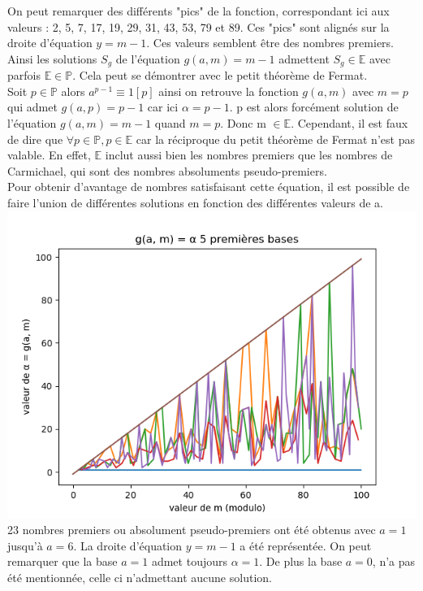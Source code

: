\documentclass{article}
\begin{document}
On peut remarquer des différents "pics" de la fonction, correspondant ici aux valeurs : 2, 5, 7, 17, 19, 29, 31, 43, 53, 79 et 89. Ces "pics" sont alignés sur la droite d'équation $y=m-1$. Ces valeurs semblent être des nombres premiers.\\
Ainsi les solutions $S_g$ de l'équation $g(a, m) = m - 1$ admettent $S_g\in\mathbb{E}$ avec parfois $\mathbb{E}\in\mathbb{P}$.
Cela peut se démontrer avec le petit théorème de Fermat.\\
Soit $p\in\mathbb{P}$ alors $a^{p-1}\equiv1[p]$ ainsi on retrouve la fonction $g(a, m)$ avec $m=p$ qui admet $g(a, p) = p - 1$ car ici $\alpha=p-1$. p est alors forcément solution de l'équation $g(a, m) = m - 1$ quand $m = p$. Donc m $\in\mathbb{E}$. Cependant, il est faux de dire que $\forall p \in\mathbb{P},p\in\mathbb{E}$ car la réciproque du petit théorème de Fermat n'est pas valable. En effet, $\mathbb{E}$ inclut aussi bien les nombres premiers que les nombres de Carmichael, qui sont des nombres absoluments pseudo-premiers.\\
Pour obtenir d'avantage de nombres satisfaisant cette équation, il est possible de faire l'union de différentes solutions en fonction des différentes valeurs de a.\\
\includegraphics{Figure_3.png}\\
23 nombres premiers ou absolument pseudo-premiers ont été obtenus avec $a = 1$ jusqu'à $a=6$. La droite d'équation $y = m - 1$ a été représentée. On peut remarquer que la base $a=1$ admet toujours $\alpha = 1$. De plus la base $a=0$, n'a pas été mentionnée, celle ci n'admettant aucune solution.\\
\end{document}
